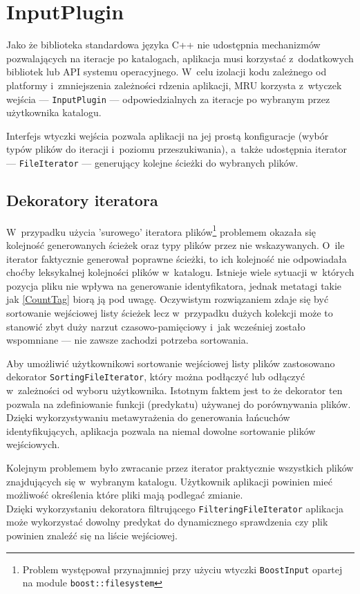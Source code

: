 \section{InputPlugin}
\par
Jako że biblioteka standardowa języka C++ nie udostępnia mechanizmów pozwalających na iteracje po katalogach, aplikacja musi korzystać z~dodatkowych bibliotek lub API systemu operacyjnego. W~celu izolacji kodu zależnego od platformy i~zmniejszenia zależności rdzenia aplikacji, MRU korzysta z~wtyczek wejścia --- \texttt{InputPlugin} --- odpowiedzialnych za iteracje po wybranym przez użytkownika katalogu.
\par
Interfejs wtyczki wejścia pozwala aplikacji na jej prostą konfiguracje (wybór typów plików do iteracji i~poziomu przeszukiwania), a~także udostępnia iterator --- \texttt{FileIterator} --- generujący kolejne ścieżki do wybranych plików.
\subsection{Dekoratory iteratora}
\par
W~przypadku użycia 'surowego' iteratora plików\footnote{Problem występował przynajmniej przy użyciu wtyczki \texttt{BoostInput} opartej na module \texttt{boost::filesystem}} problemem okazała się kolejność generowanych ścieżek oraz typy plików przez nie wskazywanych.
O~ile iterator faktycznie generował poprawne ścieżki, to ich kolejność nie odpowiadała choćby leksykalnej kolejności plików w~katalogu. Istnieje wiele sytuacji w~których pozycja pliku nie wpływa na generowanie identyfikatora, jednak metatagi takie jak \ref{CountTag} biorą ją pod uwagę. Oczywistym rozwiązaniem zdaje się być sortowanie wejściowej listy ścieżek lecz w~przypadku dużych kolekcji może to stanowić zbyt duży narzut czasowo-pamięciowy i~jak wcześniej zostało wspomniane --- nie zawsze zachodzi potrzeba sortowania.
\par
Aby umożliwić użytkownikowi sortowanie wejściowej listy plików zastosowano dekorator \texttt{SortingFileIterator}, który można podłączyć lub odłączyć w~zależności od wyboru użytkownika. Istotnym faktem jest to że dekorator ten pozwala na zdefiniowanie funkcji (predykatu) używanej do porównywania plików. Dzięki wykorzystywaniu metawyrażenia do generowania łańcuchów identyfikujących, aplikacja pozwala na niemal dowolne sortowanie plików wejściowych.

\par
Kolejnym problemem było zwracanie przez iterator praktycznie wszystkich plików znajdujących się w~wybranym katalogu. Użytkownik aplikacji powinien mieć możliwość określenia które pliki mają podlegać zmianie.\\
Dzięki wykorzystaniu dekoratora filtrującego \texttt{FilteringFileIterator} aplikacja może wykorzystać dowolny predykat do dynamicznego sprawdzenia czy plik powinien znaleźć się na liście wejściowej.

